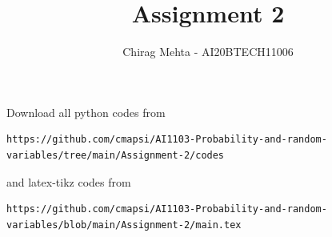 \documentclass[journal,12pt,twocolumn]{IEEEtran}
\DeclareMathOperator*{\Res}{Res}
\begin{document}
\newcommand{\BEQA}{\begin{eqnarray}}
\newcommand{\EEQA}{\end{eqnarray}}
\newcommand{\define}{\stackrel{\triangle}{=}}

\raggedbottom
\setlength{\parindent}{0pt}
\providecommand{\mbf}{\mathbf}
\providecommand{\pr}[1]{\ensuremath{\Pr\left(#1\right)}}
\providecommand{\qfunc}[1]{\ensuremath{Q\left(#1\right)}}
\providecommand{\sbrak}[1]{\ensuremath{{}\left[#1\right]}}
\providecommand{\lsbrak}[1]{\ensuremath{{}\left[#1\right.}}
\providecommand{\rsbrak}[1]{\ensuremath{{}\left.#1\right]}}
\providecommand{\brak}[1]{\ensuremath{\left(#1\right)}}
\providecommand{\lbrak}[1]{\ensuremath{\left(#1\right.}}
\providecommand{\rbrak}[1]{\ensuremath{\left.#1\right)}}
\providecommand{\cbrak}[1]{\ensuremath{\left\{#1\right\}}}
\providecommand{\lcbrak}[1]{\ensuremath{\left\{#1\right.}}
\providecommand{\rcbrak}[1]{\ensuremath{\left.#1\right\}}}
\theoremstyle{remark}
\newtheorem{rem}{Remark}
\newcommand{\sgn}{\mathop{\mathrm{sgn}}}
\providecommand{\abs}[1]{\vert#1\vert}
\providecommand{\res}[1]{\Res\displaylimits_{#1}} 
\providecommand{\norm}[1]{\lVert#1\rVert}
\providecommand{\mtx}[1]{\mathbf{#1}}
\providecommand{\mean}[1]{E[ #1 ]}
\providecommand{\fourier}{\overset{\mathcal{F}}{ \rightleftharpoons}}
\providecommand{\system}{\overset{\mathcal{H}}{ \longleftrightarrow}}
\newcommand{\solution}{\noindent \textbf{Solution: }}
\newcommand{\cosec}{\,\text{cosec}\,}
\providecommand{\dec}[2]{\ensuremath{\overset{#1}{\underset{#2}{\gtrless}}}}
\newcommand{\myvec}[1]{\ensuremath{\begin{pmatrix}#1\end{pmatrix}}}
\newcommand{\mydet}[1]{\ensuremath{\begin{vmatrix}#1\end{vmatrix}}}
\makeatletter
{}
\makeatother
\let\StandardTheFigure\thefigure
\let\vec\mathbf
\renewcommand{\thefigure}{\theproblem}
\def\putbox#1#2#3{\makebox[0in][l]{\makebox[#1][l]{}\raisebox{\baselineskip}[0in][0in]{\raisebox{#2}[0in][0in]{#3}}}}
     \def\rightbox#1{\makebox[0in][r]{#1}}
     \def\centbox#1{\makebox[0in]{#1}}
     \def\topbox#1{\raisebox{-\baselineskip}[0in][0in]{#1}}
     \def\midbox#1{\raisebox{-0.5\baselineskip}[0in][0in]{#1}}
\vspace{3cm}
\title{Assignment 2}
\author{Chirag Mehta - AI20BTECH11006}
\maketitle
\newpage
\bigskip
\renewcommand{\thefigure}{\theenumi}
\renewcommand{\thetable}{\theenumi}
Download all python codes from 
\begin{lstlisting}
https://github.com/cmapsi/AI1103-Probability-and-random-variables/tree/main/Assignment-2/codes
\end{lstlisting}
and latex-tikz codes from 
\begin{lstlisting}
https://github.com/cmapsi/AI1103-Probability-and-random-variables/blob/main/Assignment-2/main.tex
\end{lstlisting}
\end{document}

